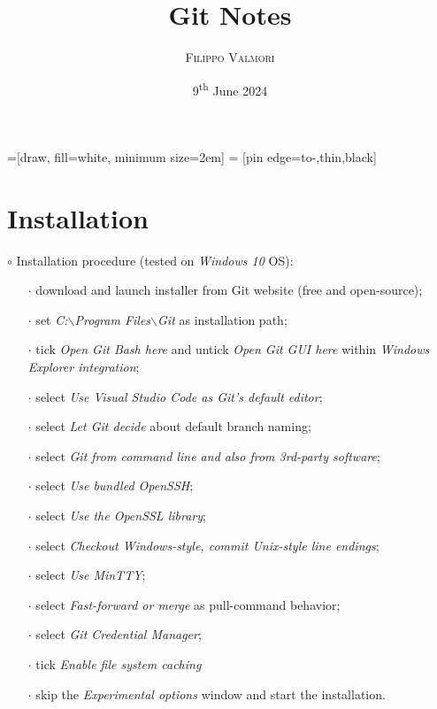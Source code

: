\documentclass[a4paper,portrait,10pt]{article}   %
\title{Git Notes}   %
\author{
  \textsc{Filippo Valmori} \\    %
}
\date{9\textsuperscript{th} June 2024}   %
\begin{document}
=[draw, fill=white, minimum size=2em]
 = [pin edge={to-,thin,black}]
\maketitle   %


\section{Installation}
$\circ$ Installation procedure (tested on \textit{Windows 10} OS):
\begin{itemize}
  \item[$\cdot$] download and launch installer from Git website (free and open-source);
  \item[$\cdot$] set \textit{C:$\backslash$Program Files$\backslash$Git} as installation path;
  \item[$\cdot$] tick \textit{Open Git Bash here} and untick \textit{Open Git GUI here} within \textit{Windows Explorer integration};
\item[$\cdot$] select \textit{Use Visual Studio Code as Git's default editor};
\item[$\cdot$] select \textit{Let Git decide} about default branch naming;
\item[$\cdot$] select \textit{Git from command line and also from 3rd-party software};
\item[$\cdot$] select \textit{Use bundled OpenSSH};
\item[$\cdot$] select \textit{Use the OpenSSL library};
\item[$\cdot$] select \textit{Checkout Windows-style, commit Unix-style line endings};
\item[$\cdot$] select \textit{Use MinTTY};
\item[$\cdot$] select \textit{Fast-forward or merge} as pull-command behavior;
\item[$\cdot$] select \textit{Git Credential Manager};
\item[$\cdot$] tick \textit{Enable file system caching}
\item[$\cdot$] skip the \textit{Experimental options} window and start the installation.
\end{itemize}

\end{document}

